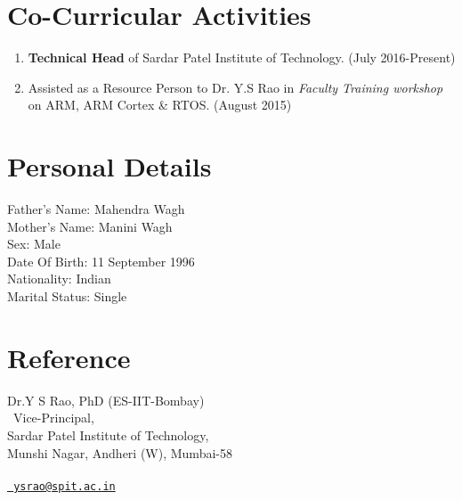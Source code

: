 \documentclass[10pt,a4paper,sans]{moderncv} %
\begin{document}
\section{Co-Curricular Activities}
\begin{enumerate}
\item \textbf{Technical Head} of Sardar Patel Institute of Technology.                           (July 2016-Present) 
\item Assisted as a Resource Person to Dr. Y.S Rao in \textit{Faculty Training workshop} on ARM, ARM Cortex \& RTOS.    (August 2015)  

\end{enumerate}




\section{Personal Details}
Father's Name: Mahendra Wagh \\
Mother's Name: Manini Wagh \\
Sex: Male \\
Date Of Birth: 11 September 1996 \\
Nationality: Indian\\
Marital Status: Single




\section{Reference}
Dr.Y S Rao, PhD (ES-IIT-Bombay)    \\                                                                                    \
Vice-Principal,      \\                                                        
Sardar Patel Institute of Technology,       \\                  
Munshi Nagar, Andheri (W), Mumbai-58     \\    
 \\    
\emailsymbol \href{mailto: ysrao@spit.ac.in}{\nolinkurl{ ysrao@spit.ac.in} }\\
\end{document}

